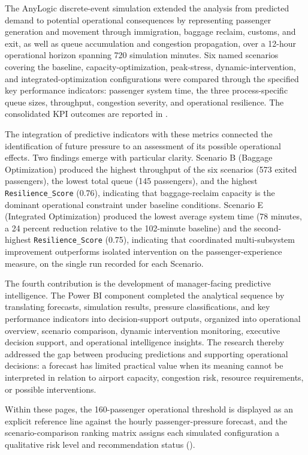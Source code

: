 The AnyLogic discrete-event simulation extended the analysis from predicted demand to potential operational consequences by representing passenger generation and movement through immigration, baggage reclaim, customs, and exit, as well as queue accumulation and congestion propagation, over a 12-hour operational horizon spanning 720 simulation minutes. Six named scenarios covering the baseline, capacity-optimization, peak-stress, dynamic-intervention, and integrated-optimization configurations were compared through the specified key performance indicators: passenger system time, the three process-specific queue sizes, throughput, congestion severity, and operational resilience. The consolidated KPI outcomes are reported in .

The integration of predictive indicators with these metrics connected the identification of future pressure to an assessment of its possible operational effects. Two findings emerge with particular clarity. Scenario B (Baggage Optimization) produced the highest throughput of the six scenarios (573 exited passengers), the lowest total queue (145 passengers), and the highest \nolinkurl{Resilience_Score} (0.76), indicating that baggage-reclaim capacity is the dominant operational constraint under baseline conditions. Scenario E (Integrated Optimization) produced the lowest average system time (78 minutes, a 24 percent reduction relative to the 102-minute baseline) and the second-highest \nolinkurl{Resilience_Score} (0.75), indicating that coordinated multi-subsystem improvement outperforms isolated intervention on the passenger-experience measure, on the single run recorded for each Scenario.

The fourth contribution is the development of manager-facing predictive intelligence. The Power BI component completed the analytical sequence by translating forecasts, simulation results, pressure classifications, and key performance indicators into decision-support outputs, organized into operational overview, scenario comparison, dynamic intervention monitoring, executive decision support, and operational intelligence insights. The research thereby addressed the gap between producing predictions and supporting operational decisions: a forecast has limited practical value when its meaning cannot be interpreted in relation to airport capacity, congestion risk, resource requirements, or possible interventions.

Within these pages, the 160-passenger operational threshold is displayed as an explicit reference line against the hourly passenger-pressure forecast, and the scenario-comparison ranking matrix assigns each simulated configuration a qualitative risk level and recommendation status ().

